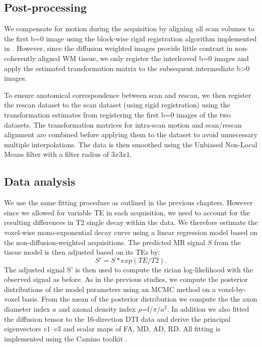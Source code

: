 \subsection*{Post-processing}
We compensate for motion during the acquisition by aligning all scan volumes to the first b=0 image using the block-wise rigid registration algorithm \citep{XX} implemented in \citep{niftyreg}. However, since the diffusion weighted images provide little contrast in non-coherently aligned WM tissue, we only register the interleaved b=0 images and apply the estimated transformation matrix to the subsequent intermediate b>0 images.   

To ensure anatomical correspondence between scan and rescan, we then register the rescan dataset to the scan dataset (using rigid registration) using the transformation estimates from registering  the first b=0 images of the two datasets. The transformation matrices for intra-scan motion and scan/rescan alignment are combined before applying them to the dataset to avoid unnecessary multiple interpolations. The data is then smoothed using the Unbiased Non-Local Means filter \citep{Aja-Fernandez:2010} with a filter radius of $3x3x1$.

\subsection*{Data analysis}
We use the same fitting procedure as outlined in the previous chapters. However since we allowed for variable TE in each acquisition, we need to account for the resulting differences in T2 single decay within the data. We therefore estimate the voxel-wise mono-exponential decay curve using a linear regression model based on the non-diffusion-weighted acquisitions. The predicted MR signal $S$ from the tissue model is then adjusted based on its \glspl{TE} by:
\begin{equation}
	S' = S * exp(TE/T2).
\end{equation}
The adjusted signal S' is then used to compute the rician log-likelihood with the observed signal as before. As in the previous studies, we compute the posterior distributions of the model parameters using an MCMC method on a voxel-by-voxel basis. From the mean of the posterior distribution we compute the the axon diameter index $a$ and axonal density index $\rho$=f/$\pi/a^2$. In addition we also fitted the diffusion tensor to the 16-direction DTI data and derive the principal eigenvectors $v1$--$v3$ and scalar maps of FA, MD, AD, RD. All fitting is implemented using the Camino toolkit \citep{Cook:2006}.
